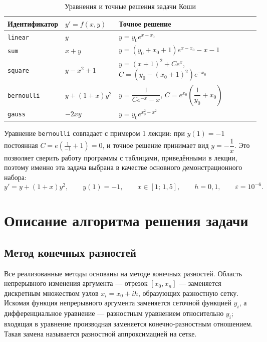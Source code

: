 \documentclass[12pt,a4paper]{article}
\begin{document}
\begin{table}[H]\centering\small
\caption{Уравнения и точные решения задачи Коши}
\begin{tabular}{llp{6.2cm}}\toprule
Идентификатор & $y'=f(x,y)$ & Точное решение\\\midrule
\texttt{linear} & $y$ & $y=y_0e^{x-x_0}$\\
\texttt{sum} & $x+y$ & $y=(y_0+x_0+1)e^{x-x_0}-x-1$\\
\texttt{square} & $y-x^2+1$ & $y=(x+1)^2+Ce^{x}$, $C=(y_0-(x_0+1)^2)e^{-x_0}$\\
\texttt{bernoulli} & $y+(1+x)y^2$ & $y=\dfrac{1}{Ce^{-x}-x}$, $C=e^{x_0}\left(\dfrac{1}{y_0}+x_0\right)$\\
\texttt{gauss} & $-2xy$ & $y=y_0e^{x_0^2-x^2}$\\\bottomrule
\end{tabular}\end{table}

Уравнение \texttt{bernoulli} совпадает с примером 1 лекции: при $y(1)=-1$
постоянная $C=e\left(\tfrac{1}{-1}+1\right)=0$, и точное решение принимает вид
$y=-\dfrac{1}{x}$. Это позволяет сверить работу программы с таблицами,
приведёнными в лекции, поэтому именно эта задача выбрана в качестве основного
демонстрационного набора:
\[
y'=y+(1+x)y^2,\qquad y(1)=-1,\qquad x\in[1;\,1{,}5],\qquad h=0{,}1,\qquad
\varepsilon=10^{-6}.
\]

\section{Описание алгоритма решения задачи}

\subsection{Метод конечных разностей}
Все реализованные методы основаны на методе конечных разностей. Область
непрерывного изменения аргумента --- отрезок $[x_0,x_n]$ --- заменяется
дискретным множеством узлов $x_i=x_0+ih$, образующих разностную сетку.
Искомая функция непрерывного аргумента заменяется сеточной функцией $y_i$,
а дифференциальное уравнение --- разностным уравнением относительно $y_i$;
входящая в уравнение производная заменяется конечно-разностным отношением.
Такая замена называется разностной аппроксимацией на сетке.
\end{document}
